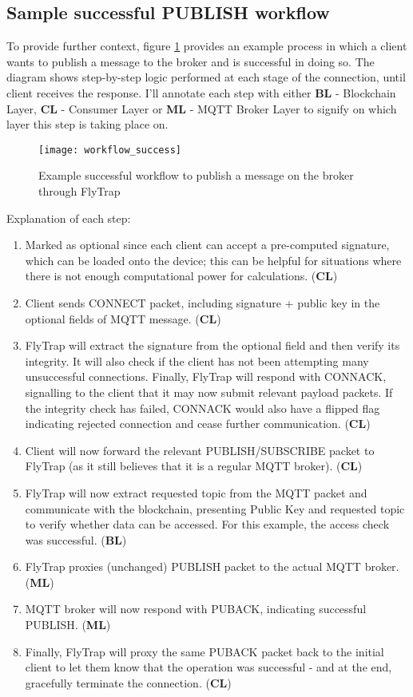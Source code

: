 \subsection{Sample successful PUBLISH workflow}
To provide further context, figure \ref{fig:workflow_success} provides an example process in which a client wants to publish a message to the broker and is successful in doing so. The diagram shows step-by-step logic performed at each stage of the connection, until client receives the response. I'll annotate each step with either \textbf{BL} - Blockchain Layer, \textbf{CL} - Consumer Layer or \textbf{ML} - MQTT Broker Layer to signify on which layer this step is taking place on.
\begin{figure}[h]
    \centering
    \texttt{[image: workflow\_success]}
    \caption{Example successful workflow to publish a message on the broker through FlyTrap}
    \label{fig:workflow_success}
\end{figure}

Explanation of each step:
\begin{enumerate}\addtocounter{enumi}{-1}
    \item Marked as optional since each client can accept a pre-computed signature, which can be loaded onto the device; this can be helpful for situations where there is not enough computational power for calculations. (\textbf{CL})
    \item Client sends CONNECT packet, including signature + public key in the optional fields of MQTT message. (\textbf{CL})
    \item FlyTrap will extract the signature from the optional field and then verify its integrity. It will also check if the client has not been attempting many unsuccessful connections. Finally, FlyTrap will respond with CONNACK, signalling to the client that it may now submit relevant payload packets. If the integrity check has failed, CONNACK would also have a flipped flag indicating rejected connection and cease further communication. (\textbf{CL})
    \item Client will now forward the relevant PUBLISH/SUBSCRIBE packet to FlyTrap (as it still believes that it is a regular MQTT broker). (\textbf{CL})
    \item FlyTrap will now extract requested topic from the MQTT packet and communicate with the blockchain, presenting Public Key and requested topic to verify whether data can be accessed. For this example, the access check was successful. (\textbf{BL})
    \item FlyTrap proxies (unchanged) PUBLISH packet to the actual MQTT broker. (\textbf{ML})
    \item MQTT broker will now respond with PUBACK, indicating successful PUBLISH. (\textbf{ML})
    \item Finally, FlyTrap will proxy the same PUBACK packet back to the initial client to let them know that the operation was successful - and at the end, gracefully terminate the connection. (\textbf{CL})
\end{enumerate}

